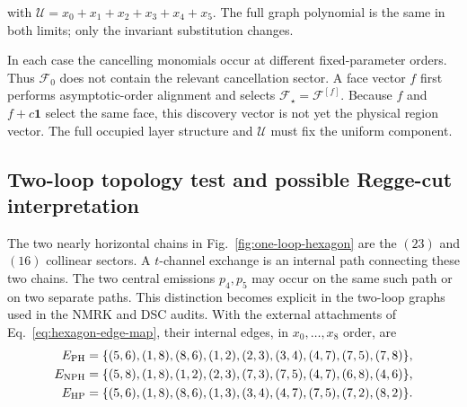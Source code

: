 \documentclass[a4paper,11pt]{article}
\begin{document}
with \(\mathcal U=x_0+x_1+x_2+x_3+x_4+x_5\).  The full graph polynomial is
the same in both limits; only the invariant substitution changes.

In each case the cancelling monomials occur at different fixed-parameter
orders.  Thus \(\mathcal F_0\) does not contain the relevant cancellation
sector.  A face vector \(f\) first performs asymptotic-order alignment and
selects \(\mathcal F_\star=\mathcal F^{[f]}\).  Because
\(f\) and \(f+c\boldsymbol1\) select the same face, this discovery vector is
not yet the physical region vector.  The full occupied layer structure and
\(\mathcal U\) must fix the uniform component.

\subsection{Two-loop topology test and possible Regge-cut interpretation}

The two nearly horizontal chains in Fig.~\ref{fig:one-loop-hexagon} are the
\((23)\) and \((16)\) collinear sectors.  A \(t\)-channel exchange is an
internal path connecting these two chains.  The two central emissions
\(p_4,p_5\) may occur on the same such path or on two separate paths.
This distinction becomes explicit in the two-loop graphs used in the NMRK
and DSC audits.  With the external attachments of
Eq.~\eqref{eq:hexagon-edge-map}, their internal edges, in
\(x_0,\ldots,x_8\) order, are
\begin{align}
 E_{\rm PH}={}&\{(5,6),(1,8),(8,6),(1,2),(2,3),
                   (3,4),(4,7),(7,5),(7,8)\},\nonumber\\
 E_{\rm NPH}={}&\{(5,8),(1,8),(1,2),(2,3),(7,3),
                   (7,5),(4,7),(6,8),(4,6)\},\nonumber\\
 E_{\rm HP}={}&\{(5,6),(1,8),(8,6),(1,3),(3,4),
                   (4,7),(7,5),(7,2),(8,2)\}.
 \label{eq:two-loop-six-point-edges}
\end{align}
\end{document}
